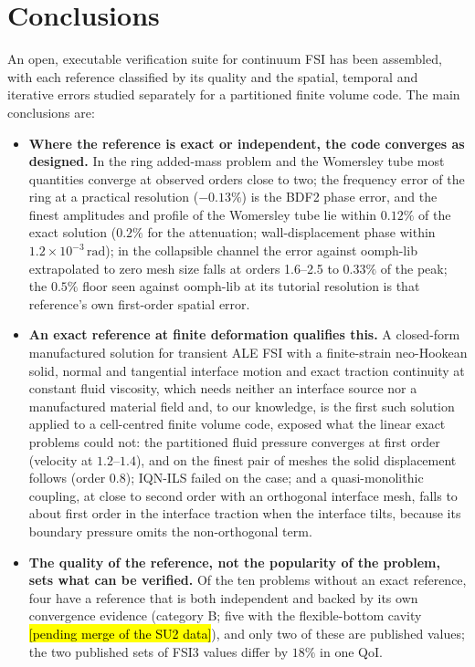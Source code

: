 \documentclass[sn-mathphys,Numbered]{sn-jnl}%
\begin{document}
\section{Conclusions} \label{sec:conclusion}
An open, executable verification suite for continuum FSI has been assembled, with each reference classified by its quality and the spatial, temporal and iterative errors studied separately for a partitioned finite volume code.
The main conclusions are:
\begin{itemize}
	\item \textbf{Where the reference is exact or independent, the code converges as designed.} In the ring added-mass problem and the Womersley tube most quantities converge at observed orders close to two; the frequency error of the ring at a practical resolution ($-0.13\%$) is the BDF2 phase error, and the finest amplitudes and profile of the Womersley tube lie within $0.12\%$ of the exact solution ($0.2\%$ for the attenuation; wall-displacement phase within $1.2\times10^{-3}\,\mathrm{rad}$); in the collapsible channel the error against oomph-lib extrapolated to zero mesh size falls at orders 1.6--2.5 to $0.33\%$ of the peak; the $0.5\%$ floor seen against oomph-lib at its tutorial resolution is that reference's own first-order spatial error.
	\item \textbf{An exact reference at finite deformation qualifies this.} A closed-form manufactured solution for transient ALE FSI with a finite-strain neo-Hookean solid, normal and tangential interface motion and exact traction continuity at constant fluid viscosity, which needs neither an interface source nor a manufactured material field and, to our knowledge, is the first such solution applied to a cell-centred finite volume code, exposed what the linear exact problems could not: the partitioned fluid pressure converges at first order (velocity at $1.2$--$1.4$), and on the finest pair of meshes the solid displacement follows (order $0.8$); IQN-ILS failed on the case; and a quasi-monolithic coupling, at close to second order with an orthogonal interface mesh, falls to about first order in the interface traction when the interface tilts, because its boundary pressure omits the non-orthogonal term.
	\item \textbf{The quality of the reference, not the popularity of the problem, sets what can be verified.} Of the ten problems without an exact reference, four have a reference that is both independent and backed by its own convergence evidence (category B; five with the flexible-bottom cavity \hl{[pending merge of the SU2 data]}), and only two of these are published values; the two published sets of FSI3 values differ by $18\%$ in one QoI.

\end{itemize}
\end{document}
